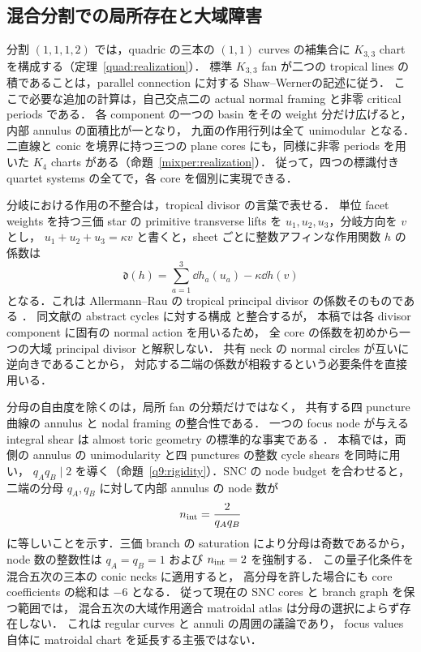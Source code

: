 \subsection{混合分割での局所存在と大域障害}

分割 $(1,1,1,2)$ では，quadric の三本の $(1,1)$ curves の補集合に
$K_{3,3}$ chart を構成する（定理~\ref{quad:realization}）．
標準 $K_{3,3}$ fan が二つの tropical lines の積であることは，parallel connection に対する
Shaw--Werner\cite[Theorem~7.2]{ShawWerner}の記述に従う．
ここで必要な追加の計算は，自己交点二の actual normal framing と非零 critical periods である．
各 component の一つの basin をその weight 分だけ広げると，内部 annulus の面積比が一となり，
九面の作用行列は全て unimodular となる．
二直線と conic を境界に持つ三つの plane cores にも，同様に非零 periods を用いた
$K_4$ charts がある（命題~\ref{mixper:realization}）．
従って，四つの標識付き quartet systems の全てで，各 core を個別に実現できる．

分岐における作用の不整合は，tropical divisor の言葉で表せる．
単位 facet weights を持つ三価 star の primitive transverse lifts を
$u_1,u_2,u_3$，分岐方向を $v$ とし，
$u_1+u_2+u_3=\kappa v$ と書くと，sheet ごとに整数アフィンな作用関数 $h$ の係数は
\[
 \mathfrak d(h)=\sum_{a=1}^3\dd h_a(u_a)-\kappa\dd h(v)
\]
となる．これは Allermann--Rau の tropical principal divisor の係数そのものである
\cite[Definition~3.4, Remark~3.5]{AllermannRau}．
同文献の abstract cycles に対する構成
\cite[Definition~6.1, Construction~6.4]{AllermannRau}と整合するが，
本稿では各 divisor component に固有の normal action を用いるため，
全 core の係数を初めから一つの大域 principal divisor と解釈しない．
共有 neck の normal circles が互いに逆向きであることから，
対応する二端の係数が相殺するという必要条件を直接用いる．

分母の自由度を除くのは，局所 fan の分類だけではなく，
共有する四 puncture 曲線の annulus と nodal framing の整合性である．
一つの focus node が与える integral shear は almost toric geometry の標準的な事実である
\cite[\S4.3, equation~(4.10)]{SymingtonFour}．
本稿では，両側の annulus の unimodularity と四 punctures の整数 cycle shears を同時に用い，
$q_Aq_B\mid2$ を導く（命題~\ref{q9:rigidity}）．SNC の node budget を合わせると，
二端の分母 $q_A,q_B$ に対して内部 annulus の node 数が
\[
 n_{\rm int}=\frac{2}{q_Aq_B}
\]
に等しいことを示す．三価 branch の saturation により分母は奇数であるから，
node 数の整数性は $q_A=q_B=1$ および $n_{\rm int}=2$ を強制する．
この量子化条件を混合五次の三本の conic necks に適用すると，
高分母を許した場合にも core coefficients の総和は $-6$ となる．
従って現在の SNC cores と branch graph を保つ範囲では，
混合五次の大域作用適合 matroidal atlas は分母の選択によらず存在しない．
これは regular curves と annuli の周囲の議論であり，
focus values 自体に matroidal chart を延長する主張ではない．

